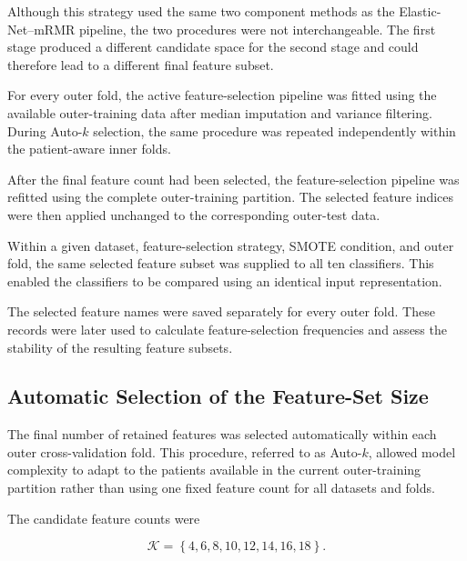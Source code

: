 \documentclass[12pt,twocolumn]{article}
\begin{document}
Although this strategy used the same two component methods as the
Elastic-Net--mRMR pipeline, the two procedures were not
interchangeable. The first stage produced a different candidate space
for the second stage and could therefore lead to a different final
feature subset.










For every outer fold, the active feature-selection pipeline was fitted
using the available outer-training data after median imputation and
variance filtering. During Auto-\(k\) selection, the same procedure
was repeated independently within the patient-aware inner folds.

After the final feature count had been selected, the feature-selection
pipeline was refitted using the complete outer-training partition.
The selected feature indices were then applied unchanged to the
corresponding outer-test data.

Within a given dataset, feature-selection strategy, SMOTE condition,
and outer fold, the same selected feature subset was supplied to all
ten classifiers. This enabled the classifiers to be compared using
an identical input representation.

The selected feature names were saved separately for every outer fold.
These records were later used to calculate feature-selection
frequencies and assess the stability of the resulting feature
subsets.







\subsection{Automatic Selection of the Feature-Set Size}
\label{subsec:auto_k}

The final number of retained features was selected automatically within
each outer cross-validation fold. This procedure, referred to as
Auto-\(k\), allowed model complexity to adapt to the patients available
in the current outer-training partition rather than using one fixed
feature count for all datasets and folds.

The candidate feature counts were

\begin{equation}
\mathcal{K}
=
\left\{
4,6,8,10,12,14,16,18
\right\}.
\label{eq:auto_k_candidates}
\end{equation}
\end{document}
